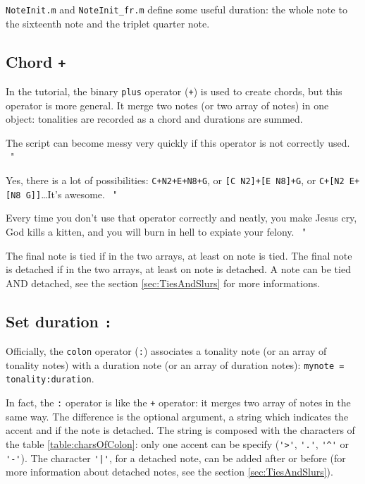 \documentclass{article}
\newcommand\noteInitFile{\texttt{NoteInit.m}\xspace}
\newcommand\noteInitFrFile{\texttt{NoteInit\_fr.m}\xspace}
\newenvironment{meenv}{ \par \noindent \makebox[6em][r]{ \textcolor{mecolor}{Me}: " --~}}{~"}
\newenvironment{myselfenv}{ \par \noindent \makebox[6em][r]{ \textcolor{myselfcolor}{Myself}: " --~}}{~"}
\newcommand{ \me }[1]{%
\begin{meenv}%
	#1%
\end{meenv} }
\newcommand{ \myself }[1]{%
\begin{myselfenv}%
	#1%
\end{myselfenv} }
\begin{document}
\noteInitFile and \noteInitFrFile define some useful duration: the whole note to the sixteenth note and the triplet quarter note.

\subsection{Chord \lstinline!+!}

In the tutorial, the binary \lstinline!plus! operator (\lstinline!+!) is used to create chords, but this operator is more general. It merge two notes (or two array of notes) in one object: tonalities are recorded as a chord and durations are summed.

\myself{ The script can become messy very quickly if this operator is not correctly used.}
\me{ Yes, there is a lot of possibilities: \lstinline!C+N2+E+N8+G!, or \lstinline![C N2]+[E N8]+G!, or \lstinline!C+[N2 E+[N8 G]]!\dots It's awesome. }
\myself{ Every time you don't use that operator correctly and neatly, you make Jesus cry, God kills a kitten, and you will burn in hell to expiate your felony. }

The final note is tied if in the two arrays, at least on note is tied. The final note is detached if in the two arrays, at least on note is detached. A note can be tied AND detached, see the section \ref{sec:TiesAndSlurs} for more informations.

\subsection{Set duration \lstinline!:!}

Officially, the \lstinline!colon! operator (\lstinline!:!) associates a tonality note (or an array of tonality notes) with a duration note (or an array of duration notes): \lstinline!mynote = tonality:duration!.

In fact, the \lstinline!:! operator is like the \lstinline!+! operator: it merges two array of notes in the same way. The difference is the optional argument, a string which indicates the accent and if the note is detached. The string is composed with the characters of the table \ref{table:charsOfColon}: only one accent can be specify (\lstinline!'>'!, \lstinline!'.'!, \lstinline!'^'! or \lstinline!'-'!). The character \lstinline!'|'!, for a detached note, can be added after or before (for more information about detached notes, see the section \ref{sec:TiesAndSlurs}).
\end{document}
